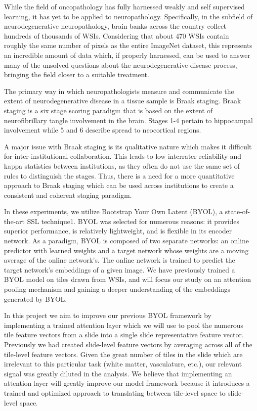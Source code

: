 \documentclass{article} %
\begin{document}
While the field of oncopathology has fully harnessed weakly and self supervised learning, it has yet to be applied to neuropathology. Specifically, in the subfield of neurodegenerative neuropathology, brain banks across the country collect hundreds of thousands of WSIs. Considering that about 470 WSIs contain roughly the same number of pixels as the entire ImageNet dataset, this represents an incredible amount of data which, if properly harnessed, can be used to answer many of the unsolved questions about the neurodegenerative disease process, bringing the field closer to a suitable treatment. 

The primary way in which neuropathologists measure and communicate the extent of neurodegenerative disease in a tissue sample is Braak staging. Braak staging is a six stage scoring paradigm that is based on the extent of neurofibrillary tangle involvement in the brain. Stages 1-4 pertain to hippocampal involvement while  5 and 6 describe spread to neocortical regions. 

A major issue with Braak staging is its qualitative nature which makes it difficult for inter-institutional collaboration. This leads to low interrater reliability and kappa statistics between institutions, as they often do not use the same set of rules to distinguish the stages. Thus, there is a need for a more quantitative approach to Braak staging which can be used across institutions to create a consistent and coherent staging paradigm.  

In these experiments, we utilize Bootstrap Your Own Latent (BYOL), a state-of-the-art SSL technique1. BYOL was selected for numerous reasons: it provides superior performance, is relatively lightweight, and is flexible in its encoder network. As a paradigm, BYOL is composed of two separate networks: an online predictor with learned weights and a target network whose weights are a moving average of the online network’s. The online network is trained to predict the target network’s embeddings of a given image. We have previously trained a BYOL model on tiles drawn from WSIs, and will focus our study on an attention pooling mechanism and gaining a deeper understanding of the embeddings generated by BYOL.  

In this project we aim to improve our previous BYOL framework by implementing a trained attention layer which we will use to pool the numerous tile feature vectors from a slide into a single slide representative feature vector. Previously we had created slide-level feature vectors by averaging across all of the tile-level feature vectors. Given the great number of tiles in the slide which are irrelevant to this particular task (white matter, vasculature, etc.), our relevant signal was greatly diluted in the analysis. We believe that implementing an attention layer will greatly improve our model framework because it introduces a trained and optimized approach to translating between tile-level space to slide-level space.  
\end{document}
